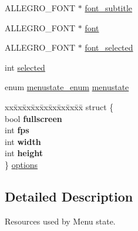 \begin{DoxyCompactItemize}
A\+L\+L\+E\+G\+R\+O\+\_\+\+F\+O\+N\+T $\ast$ \hyperlink{structMenuResources_ae2c5efc61c728e78e711b98d4439597d}{font\+\_\+subtitle}
\item 
A\+L\+L\+E\+G\+R\+O\+\_\+\+F\+O\+N\+T $\ast$ \hyperlink{structMenuResources_a859180da0537e52cf2813c2dc1f41e5e}{font}
\item 
A\+L\+L\+E\+G\+R\+O\+\_\+\+F\+O\+N\+T $\ast$ \hyperlink{structMenuResources_af0e2a49f0013d401f16ca00143ef75d1}{font\+\_\+selected}
\item 
int \hyperlink{structMenuResources_a19d2b3e2498abfdd4237a9057549f36e}{selected}
\item 
enum \hyperlink{menu_8h_a5b988954c565e5ff444d61085e367fae}{menustate\+\_\+enum} \hyperlink{structMenuResources_a14a8fefd558cf4abab26b7736545f24e}{menustate}
\item 
\begin{tabbing}
xx\=xx\=xx\=xx\=xx\=xx\=xx\=xx\=xx\=\kill
struct \{\\
\>bool {\bfseries fullscreen}\\
\>int {\bfseries fps}\\
\>int {\bfseries width}\\
\>int {\bfseries height}\\
\} \hyperlink{structMenuResources_ac0a8a510aa2b0980f30cf2bd98bccd77}{options}\\

\end{tabbing}\end{DoxyCompactItemize}


\subsection{Detailed Description}
Resources used by Menu state. 

